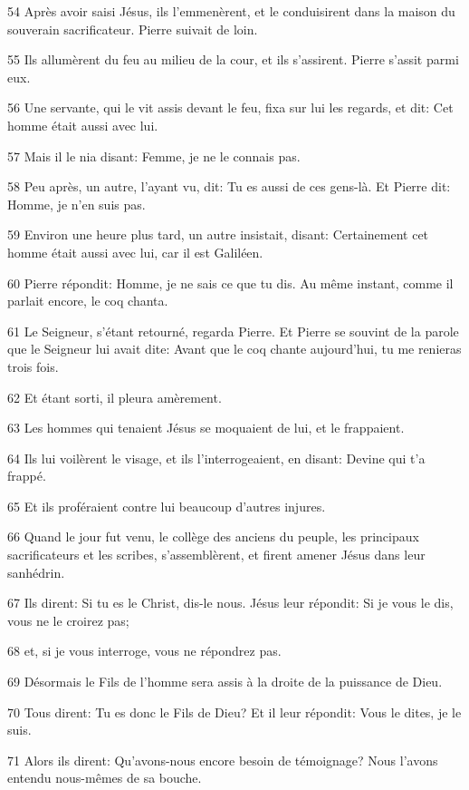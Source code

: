 \par 54 Après avoir saisi Jésus, ils l'emmenèrent, et le conduisirent dans la maison du souverain sacrificateur. Pierre suivait de loin.
\par 55 Ils allumèrent du feu au milieu de la cour, et ils s'assirent. Pierre s'assit parmi eux.
\par 56 Une servante, qui le vit assis devant le feu, fixa sur lui les regards, et dit: Cet homme était aussi avec lui.
\par 57 Mais il le nia disant: Femme, je ne le connais pas.
\par 58 Peu après, un autre, l'ayant vu, dit: Tu es aussi de ces gens-là. Et Pierre dit: Homme, je n'en suis pas.
\par 59 Environ une heure plus tard, un autre insistait, disant: Certainement cet homme était aussi avec lui, car il est Galiléen.
\par 60 Pierre répondit: Homme, je ne sais ce que tu dis. Au même instant, comme il parlait encore, le coq chanta.
\par 61 Le Seigneur, s'étant retourné, regarda Pierre. Et Pierre se souvint de la parole que le Seigneur lui avait dite: Avant que le coq chante aujourd'hui, tu me renieras trois fois.
\par 62 Et étant sorti, il pleura amèrement.
\par 63 Les hommes qui tenaient Jésus se moquaient de lui, et le frappaient.
\par 64 Ils lui voilèrent le visage, et ils l'interrogeaient, en disant: Devine qui t'a frappé.
\par 65 Et ils proféraient contre lui beaucoup d'autres injures.
\par 66 Quand le jour fut venu, le collège des anciens du peuple, les principaux sacrificateurs et les scribes, s'assemblèrent, et firent amener Jésus dans leur sanhédrin.
\par 67 Ils dirent: Si tu es le Christ, dis-le nous. Jésus leur répondit: Si je vous le dis, vous ne le croirez pas;
\par 68 et, si je vous interroge, vous ne répondrez pas.
\par 69 Désormais le Fils de l'homme sera assis à la droite de la puissance de Dieu.
\par 70 Tous dirent: Tu es donc le Fils de Dieu? Et il leur répondit: Vous le dites, je le suis.
\par 71 Alors ils dirent: Qu'avons-nous encore besoin de témoignage? Nous l'avons entendu nous-mêmes de sa bouche.

